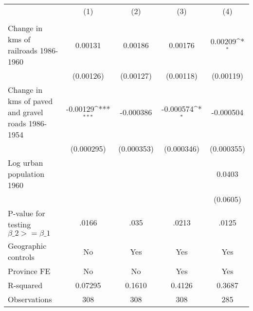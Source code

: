 {
\def\sym#1{\ifmmode^{#1}\else\(^{#1}\)\fi}
\begin{tabular}{l*{4}{c}}
\hline\hline
                &\multicolumn{1}{c}{(1)}&\multicolumn{1}{c}{(2)}&\multicolumn{1}{c}{(3)}&\multicolumn{1}{c}{(4)}\\
                &\multicolumn{1}{c}{}&\multicolumn{1}{c}{}&\multicolumn{1}{c}{}&\multicolumn{1}{c}{}\\
\hline
Change in kms of railroads 1986-1960&  0.00131         &  0.00186         &  0.00176         &  0.00209\sym{*}  \\
                &(0.00126)         &(0.00127)         &(0.00118)         &(0.00119)         \\
[1em]
Change in kms of paved and gravel roads 1986-1954& -0.00129\sym{***}&-0.000386         &-0.000574\sym{*}  &-0.000504         \\
                &(0.000295)         &(0.000353)         &(0.000346)         &(0.000355)         \\
[1em]
Log urban population 1960&                  &                  &                  &   0.0403         \\
                &                  &                  &                  & (0.0605)         \\
\hline
P-value for testing $\beta\_{2} >= \beta\_{1}$&    .0166         &     .035         &    .0213         &    .0125         \\
Geographic controls&       No         &      Yes         &      Yes         &      Yes         \\
Province FE     &       No         &       No         &      Yes         &      Yes         \\
R-squared       &  0.07295         &   0.1610         &   0.4126         &   0.3687         \\
Observations    &      308         &      308         &      308         &      285         \\
\hline\hline
\end{tabular}
}

